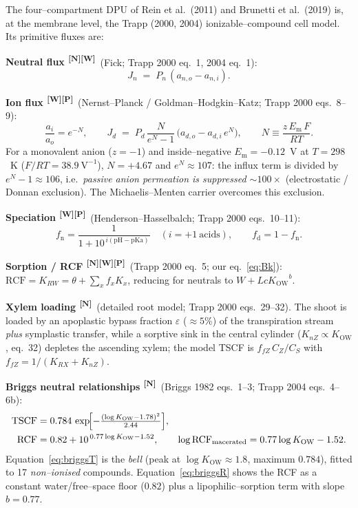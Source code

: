 \documentclass[11pt]{article}
\newcommand{\cN}{\textsuperscript{\textcolor{cNcol}{[N]}}}
\newcommand{\cW}{\textsuperscript{\textcolor{cWcol}{[W]}}}
\newcommand{\cP}{\textsuperscript{\textcolor{cPcol}{[P]}}}
\newcommand{\Em}{\ensuremath{E_{\mathrm{m}}}}
\newcommand{\fd}{\ensuremath{f_{\mathrm{d}}}}
\newcommand{\fnn}{\ensuremath{f_{\mathrm{n}}}}
\newcommand{\Kow}{\ensuremath{K_{\mathrm{OW}}}}
\newcommand{\TSCF}{\ensuremath{\mathrm{TSCF}}}
\newcommand{\RCF}{\ensuremath{\mathrm{RCF}}}
\begin{document}
The four--compartment DPU of Rein et al.\ (2011) and Brunetti et al.\ (2019) is, at the
membrane level, the Trapp (2000, 2004) ionizable--compound cell model. Its primitive fluxes are:

\noindent\textbf{Neutral flux \cN\cW}\ (Fick; Trapp 2000 eq.~1, 2004 eq.~1):
\begin{equation}\label{eq:fick}
J_n \;=\; P_n\,(a_{n,o}-a_{n,i}).
\end{equation}

\noindent\textbf{Ion flux \cW\cP}\ (Nernst--Planck / Goldman--Hodgkin--Katz; Trapp 2000 eqs.~8--9):
\begin{equation}\label{eq:ghk}
\frac{a_i}{a_o}=e^{-N},\qquad
J_d \;=\; P_d\,\frac{N}{e^{N}-1}\,\bigl(a_{d,o}-a_{d,i}\,e^{N}\bigr),\qquad
N \equiv \frac{z\,\Em\,F}{RT}.
\end{equation}
For a monovalent anion ($z=-1$) and inside--negative $\Em=-0.12$~V at $T=298$~K
($F/RT=38.9~\mathrm{V^{-1}}$), $N=+4.67$ and $e^{N}\approx107$: the influx term is divided by
$e^{N}-1\approx106$, i.e.\ \emph{passive anion permeation is suppressed $\sim\!100\times$}
(electrostatic / Donnan exclusion). The Michaelis--Menten carrier overcomes this exclusion.

\noindent\textbf{Speciation \cW\cP}\ (Henderson--Hasselbalch; Trapp 2000 eqs.~10--11):
\begin{equation}\label{eq:hh}
\fnn=\frac{1}{1+10^{\,i(\mathrm{pH}-\mathrm{pKa})}}\quad(i=+1\ \text{acids}),
\qquad \fd=1-\fnn .
\end{equation}

\noindent\textbf{Sorption / RCF \cN\cW\cP}\ (Trapp 2000 eq.~5; our eq.~\ref{eq:Bk}):
$\RCF=K_{RW}=\theta+\sum_x f_xK_x$, reducing for neutrals to $W+Lc\Kow^{b}$.

\noindent\textbf{Xylem loading \cN}\ (detailed root model; Trapp 2000 eqs.~29--32). The shoot is
loaded by an apoplastic bypass fraction $\varepsilon$ ($\approx5\%$) of the transpiration stream
\emph{plus} symplastic transfer, while a sorptive sink in the central cylinder
($K_{nZ}\propto\Kow$, eq.~32) depletes the ascending xylem; the model TSCF is
$f_{fZ}\,C_Z/C_S$ with $f_{fZ}=1/(K_{RX}+K_{nZ})$.

\noindent\textbf{Briggs neutral relationships \cN}\ (Briggs 1982 eqs.~1--3; Trapp 2004 eqs.~4--6b):
\begin{align}
\TSCF &= 0.784\,\exp\!\Bigl[-\tfrac{(\log\Kow-1.78)^2}{2.44}\Bigr], \label{eq:briggsT}\\
\RCF &= 0.82 + 10^{\,0.77\log\Kow-1.52}, \qquad
\log\RCF_{\text{macerated}} = 0.77\log\Kow-1.52. \label{eq:briggsR}
\end{align}
Equation~\eqref{eq:briggsT} is the \emph{bell} (peak at $\log\Kow\approx1.8$, maximum $0.784$),
fitted to 17 \emph{non--ionised} compounds. Equation~\eqref{eq:briggsR} shows the RCF as a constant
water/free--space floor ($0.82$) plus a lipophilic--sorption term with slope $b=0.77$.
\end{document}
